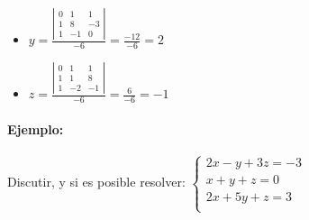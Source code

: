 \begin{itemize}
\begin{itemize}
        \item $y=\frac{\left|\begin{matrix}0 & 1 & 1\\1 & 8 & -3\\1 & -1 & 0\end{matrix}\right|}{-6}=\frac{-12}{-6}=2$
        \item $z=\frac{\left|\begin{matrix}0 & 1 & 1\\1 & 1 & 8\\1 & -2 & -1\end{matrix}\right|}{-6}=\frac{6}{-6}=-1$
    \end{itemize}
\end{itemize}

\paragraph{Ejemplo:} Discutir, y si es posible resolver:
$\left\{ \begin{matrix}2 x - y + 3 z = -3 \\ x + y + z = 0 \\ 2 x + 5 y + z = 3 \\ \end{matrix}\right.$

